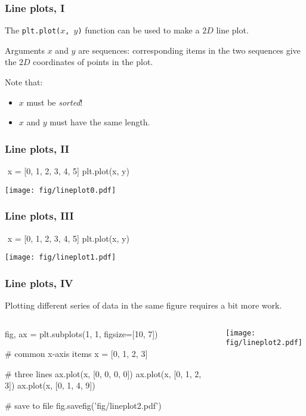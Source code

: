 \documentclass[english,serif,mathserif,xcolor=pdftex,dvipsnames,table]{beamer}
\begin{document}
\begin{frame}
  \frametitle{Line plots, I}
  The \texttt{plt.plot($x$, $y$)} function can be used to make a $2D$ line plot.

  \+
  Arguments \texttt{$x$} and \texttt{$y$} are sequences: corresponding items in
  the two sequences give the $2D$ coordinates of points in the plot.

  \+
  Note that:
  \begin{itemize}
  \item \texttt{$x$} must be \emph{sorted}!
  \item \texttt{$x$} and \texttt{$y$} must have the same length.
  \end{itemize}
\end{frame}


\begin{frame}[fragile]
  \frametitle{Line plots, II}
\begin{semiverbatim}\small
\In \,\,x = [0, 1, 2, 3, 4, 5]
\In {}
\In plt.plot(x, y)
\end{semiverbatim}
  \begin{center}
    \texttt{[image: fig/lineplot0.pdf]}
  \end{center}
\end{frame}


\begin{frame}[fragile]
  \frametitle{Line plots, III}
\begin{semiverbatim}\small
\In \,\,x = [0, 1, 2, 3, 4, 5]
\In {}
\In plt.plot(x, y)
\end{semiverbatim}
  \begin{center}
    \texttt{[image: fig/lineplot1.pdf]}
  \end{center}
\end{frame}


\begin{frame}[fragile]
  \frametitle{Line plots, IV}
    Plotting different series of data in the same figure requires a bit more work.

\begin{columns}
    \begin{column}{0.5\linewidth}
      \begin{python}
fig, ax = plt.subplots(1, 1, figsize=[10, 7])

# common x-axis items
x = [0, 1, 2, 3]

# three lines
ax.plot(x, [0, 0, 0, 0])
ax.plot(x, [0, 1, 2, 3])
ax.plot(x, [0, 1, 4, 9])


# save to file
fig.savefig('fig/lineplot2.pdf')
      \end{python}
    \end{column}
    \begin{column}{0.5\linewidth}
      \begin{center}
        \texttt{[image: fig/lineplot2.pdf]}
      \end{center}
    \end{column}
  \end{columns}
\end{frame}
\end{document}
